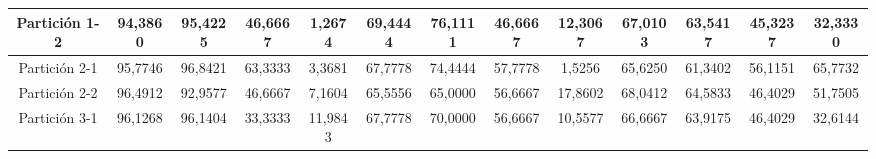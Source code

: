 \documentclass[12pt]{article}
\begin{document}
\begin{table}[H]
{\begin{tabular}{|c|cccc|cccc|cccc|}
Partición 1-2 & \multicolumn{1}{c|}{94,3860}                                                  & \multicolumn{1}{c|}{95,4225}                                                 & \multicolumn{1}{c|}{46,6667} & 1,2674  & \multicolumn{1}{c|}{69,4444}                                                  & \multicolumn{1}{c|}{76,1111}                                                 & \multicolumn{1}{c|}{46,6667} & 12,3067 & \multicolumn{1}{c|}{67,0103}                                                  & \multicolumn{1}{c|}{63,5417}                                                 & \multicolumn{1}{c|}{45,3237} & 32,3330 \\ \hline
Partición 2-1 & \multicolumn{1}{c|}{95,7746}                                                  & \multicolumn{1}{c|}{96,8421}                                                 & \multicolumn{1}{c|}{63,3333} & 3,3681  & \multicolumn{1}{c|}{67,7778}                                                  & \multicolumn{1}{c|}{74,4444}                                                 & \multicolumn{1}{c|}{57,7778} & 1,5256  & \multicolumn{1}{c|}{65,6250}                                                  & \multicolumn{1}{c|}{61,3402}                                                 & \multicolumn{1}{c|}{56,1151} & 65,7732 \\ \hline
Partición 2-2 & \multicolumn{1}{c|}{96,4912}                                                  & \multicolumn{1}{c|}{92,9577}                                                 & \multicolumn{1}{c|}{46,6667} & 7,1604  & \multicolumn{1}{c|}{65,5556}                                                  & \multicolumn{1}{c|}{65,0000}                                                 & \multicolumn{1}{c|}{56,6667} & 17,8602 & \multicolumn{1}{c|}{68,0412}                                                  & \multicolumn{1}{c|}{64,5833}                                                 & \multicolumn{1}{c|}{46,4029} & 51,7505 \\ \hline
Partición 3-1 & \multicolumn{1}{c|}{96,1268}                                                  & \multicolumn{1}{c|}{96,1404}                                                 & \multicolumn{1}{c|}{33,3333} & 11,9843 & \multicolumn{1}{c|}{67,7778}                                                  & \multicolumn{1}{c|}{70,0000}                                                 & \multicolumn{1}{c|}{56,6667} & 10,5577 & \multicolumn{1}{c|}{66,6667}                                                  & \multicolumn{1}{c|}{63,9175}                                                 & \multicolumn{1}{c|}{46,4029} & 32,6144 \\ \hline

\end{tabular}}
\end{table}
\end{document}

